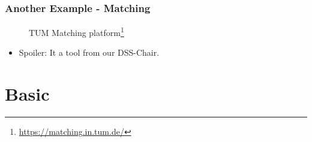 \documentclass{beamer}
\begin{document}
\begin{frame}
	\frametitle{Another Example - Matching}
	\begin{figure}
		\caption{TUM Matching platform\footnote{\url{https://matching.in.tum.de/}}}
	\end{figure} 
	\pause
	\begin{itemize}
		\item Spoiler: It a tool from our DSS-Chair.
	\end{itemize}
\end{frame}


\section{Basic} %
\begin{frame} 
	\tableofcontents[currentsection]
\end{frame}
\end{document}
